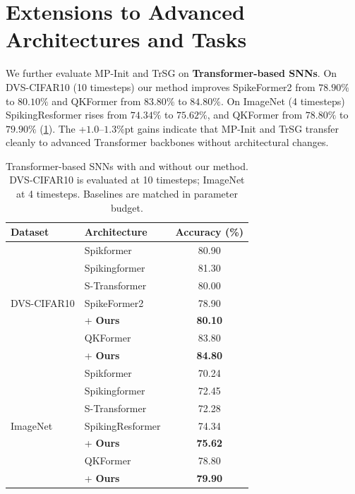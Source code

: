 \section{Extensions to Advanced Architectures and Tasks}
\label{sec:exp_extensions}

We further evaluate MP-Init and TrSG on \textbf{Transformer-based SNNs}. On DVS-CIFAR10 (10 timesteps) our method improves SpikeFormer2 from $78.90\%$ to \textbf{$80.10\%$} and QKFormer from $83.80\%$ to \textbf{$84.80\%$}. On ImageNet (4 timesteps) SpikingResformer rises from $74.34\%$ to \textbf{$75.62\%$}, and QKFormer from $78.80\%$ to \textbf{$79.90\%$} (\cref{tab:advanced_snn}). The +$1.0$--$1.3$\%pt gains indicate that MP-Init and TrSG transfer cleanly to advanced Transformer backbones without architectural changes.

\begin{table}[h]
\centering
\small
\begin{tabular}{llc}
\toprule
\textbf{Dataset} & \textbf{Architecture} & \textbf{Accuracy (\%)} \\
\midrule
\multirow{7}{*}{DVS-CIFAR10}
& Spikformer~\cite{zhou2023spikformer} & 80.90 \\
& Spikingformer~\cite{zhou2023spikingformer} & 81.30 \\
& S-Transformer~\cite{yao2023stransformer} & 80.00 \\
& SpikeFormer2~\cite{zhou:2024} & 78.90 \\
& \quad + \textbf{Ours} & \textbf{80.10} \\
& QKFormer~\cite{zhou:2024_2} & 83.80 \\
& \quad + \textbf{Ours} & \textbf{84.80} \\
\midrule
\multirow{7}{*}{ImageNet}
& Spikformer~\cite{zhou2023spikformer} & 70.24 \\
& Spikingformer~\cite{zhou2023spikingformer} & 72.45 \\
& S-Transformer~\cite{yao2023stransformer} & 72.28 \\
& SpikingResformer~\cite{shi:2024} & 74.34 \\
& \quad + \textbf{Ours} & \textbf{75.62} \\
& QKFormer~\cite{zhou:2024_2} & 78.80 \\
& \quad + \textbf{Ours} & \textbf{79.90} \\
\bottomrule
\end{tabular}
\caption{Transformer-based SNNs with and without our method. DVS-CIFAR10 is evaluated at 10 timesteps; ImageNet at 4 timesteps. Baselines are matched in parameter budget.}
\label{tab:advanced_snn}
\end{table}

